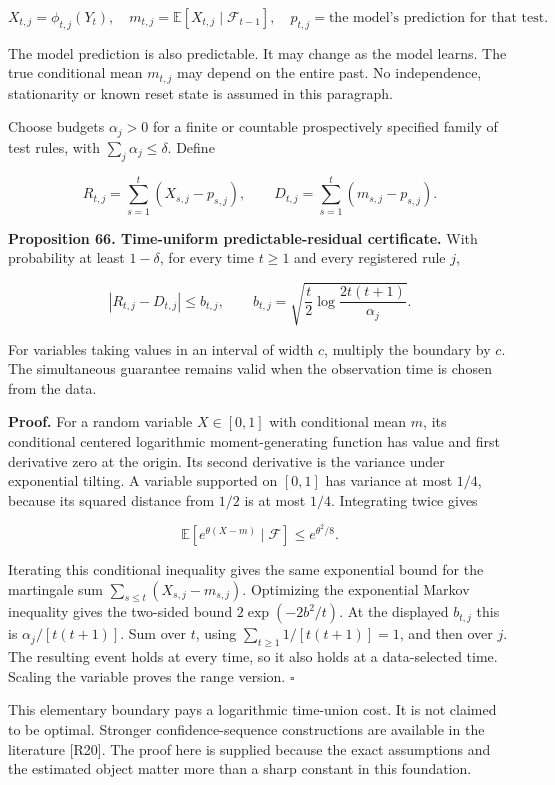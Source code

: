 \documentclass[11pt,letterpaper]{article}
\begin{document}
\[
X_{t,j}=\phi_{t,j}(Y_t),\quad
m_{t,j}=\mathbb E[X_{t,j}\mid\mathcal F_{t-1}],\quad
p_{t,j}=\text{the model's prediction for that test}.
\]

The model prediction is also predictable. It may change as the model
learns. The true conditional mean \(m_{t,j}\) may depend on the entire
past. No independence, stationarity or known reset state is assumed in
this paragraph.

Choose budgets \(\alpha_j>0\) for a finite or countable prospectively
specified family of test rules, with \(\sum_j\alpha_j\leq\delta\).
Define

\[
R_{t,j}=\sum_{s=1}^t(X_{s,j}-p_{s,j}),\qquad
D_{t,j}=\sum_{s=1}^t(m_{s,j}-p_{s,j}).
\]

\textbf{Proposition 66. Time-uniform predictable-residual certificate.}
With probability at least \(1-\delta\), for every time \(t\geq1\) and
every registered rule \(j\),

\[
\boxed{
|R_{t,j}-D_{t,j}|\leq
b_{t,j},\qquad
b_{t,j}=\sqrt{\frac t2\log\frac{2t(t+1)}{\alpha_j}}.
}
\]

For variables taking values in an interval of width \(c\), multiply the
boundary by \(c\). The simultaneous guarantee remains valid when the
observation time is chosen from the data.

\textbf{Proof.} For a random variable \(X\in[0,1]\) with conditional
mean \(m\), its conditional centered logarithmic moment-generating
function has value and first derivative zero at the origin. Its second
derivative is the variance under exponential tilting. A variable
supported on \([0,1]\) has variance at most \(1/4\), because its squared
distance from \(1/2\) is at most \(1/4\). Integrating twice gives

\[
\mathbb E[e^{\theta(X-m)}\mid\mathcal F]\leq e^{\theta^2/8}.
\]

Iterating this conditional inequality gives the same exponential bound
for the martingale sum \(\sum_{s\leq t}(X_{s,j}-m_{s,j})\). Optimizing
the exponential Markov inequality gives the two-sided bound
\(2\exp(-2b^2/t)\). At the displayed \(b_{t,j}\) this is
\(\alpha_j/[t(t+1)]\). Sum over \(t\), using
\(\sum_{t\geq1}1/[t(t+1)]=1\), and then over \(j\). The resulting event
holds at every time, so it also holds at a data-selected time. Scaling
the variable proves the range version. \(\square\)

This elementary boundary pays a logarithmic time-union cost. It is not
claimed to be optimal. Stronger confidence-sequence constructions are
available in the literature {[}R20{]}. The proof here is supplied
because the exact assumptions and the estimated object matter more than
a sharp constant in this foundation.
\end{document}
